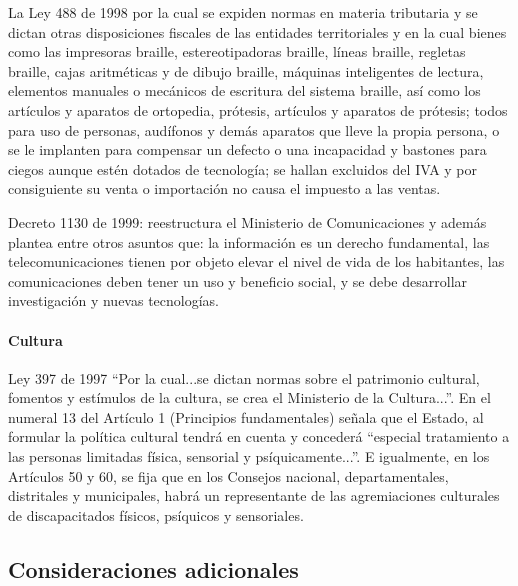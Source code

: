 \documentclass[a4paper, 12pt, oneside]{article}
\begin{document}
	La Ley 488 de 1998 por la cual se expiden normas en materia tributaria y se dictan otras disposiciones fiscales de las entidades territoriales y en la cual bienes como las impresoras braille, estereotipadoras braille, líneas braille, regletas braille, cajas aritméticas y de dibujo braille, máquinas inteligentes de lectura, elementos manuales o mecánicos de escritura del sistema braille, así como los artículos y aparatos de ortopedia, prótesis, artículos y aparatos de prótesis; todos para uso de personas, audífonos y demás aparatos que lleve la propia persona, o se le implanten para compensar un defecto o una incapacidad y bastones para ciegos aunque estén dotados de tecnología; se hallan excluidos del IVA y por consiguiente su venta o importación no causa el impuesto a las ventas. 

	Decreto 1130 de 1999: reestructura el Ministerio de Comunicaciones y además plantea entre otros asuntos que: la información es un derecho fundamental, las telecomunicaciones tienen por objeto elevar el nivel de vida de los habitantes, las comunicaciones deben tener un uso y beneficio social, y se debe desarrollar investigación y nuevas tecnologías.

	\paragraph{Cultura}

	Ley 397 de 1997 “Por la cual...se dictan normas sobre el patrimonio cultural, fomentos y estímulos de la cultura, se crea el Ministerio de la Cultura...”. En el numeral 13 del Artículo 1 (Principios fundamentales) señala que el Estado, al formular la política cultural tendrá en cuenta y concederá “especial tratamiento a las personas limitadas física, sensorial y psíquicamente...”. E igualmente, en los Artículos 50 y 60, se fija que en los Consejos nacional, departamentales, distritales y municipales, habrá un representante de las agremiaciones culturales de discapacitados físicos, psíquicos y sensoriales.

	
	\clearpage

	\begin{center}
	\section{Consideraciones adicionales}
	\end{center}
\end{document}
